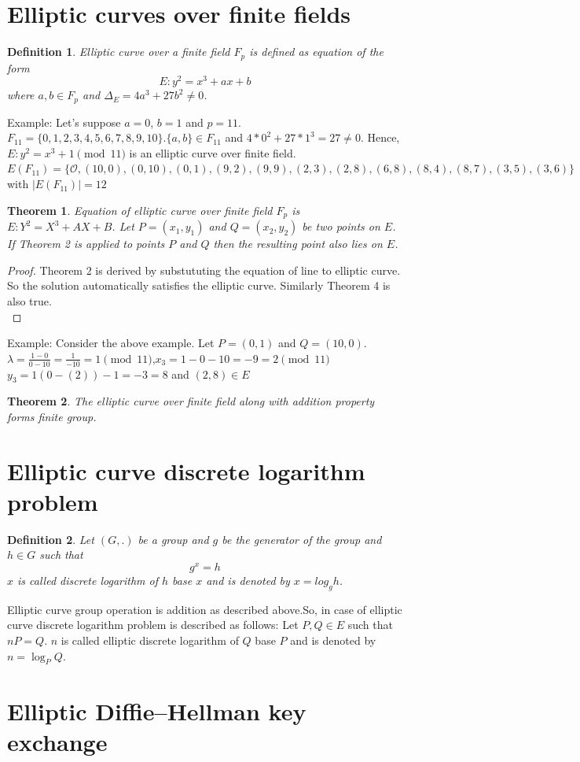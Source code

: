 \documentclass[12pt,a4paper]{report}
\newtheorem{theorem}{Theorem}
\newtheorem{definition}{Definition}
\begin{document}
\section{Elliptic curves over ﬁnite ﬁelds}
\begin{definition}
Elliptic curve over a finite field $F_p$ is defined as equation of the form $$E:y^2 = x^3+ax+b$$ where $a,b\in F_p$ and $\Delta_E = 4a^3+27b^2\neq 0$. 
\end{definition}
Example:
Let's suppose $a=0$, $b=1$ and $p=11$. \\
$F_{11}=\{0,1,2,3,4,5,6,7,8,9,10\}$.$\{a,b\}\in F_{11}$ and $4*0^2+27*1^3=27\neq 0$. Hence, $E:y^2 = x^3+1 \pmod {11} $ is an elliptic curve over finite field. \\
$E(F_{11}) = \{\mathscr{O},(10,0),(0,10),(0,1),(9,2),(9,9),(2,3),(2,8),(6,8),(8,4),(8,7),(3,5),(3,6)\}$
with $|E(F_{11})|=12$
\begin{theorem}
Equation of elliptic curve over finite field $F_p$ is $E : Y^2=X^3+
AX+B$. Let $P=(x_1,y_1)$ and $Q=(x_2,y_2)$ be two points on $E$. If Theorem 2 is applied to points $P$ and $Q$ then the resulting point also lies on $E$.
\end{theorem}
\begin{proof}
Theorem 2 is derived by substututing the equation of line to elliptic curve. So the solution automatically satisfies the elliptic curve. Similarly Theorem 4 is also true.\\
\end{proof}
Example: Consider the above example. Let $P=(0,1)$ and $Q=(10,0)$. 
$\lambda = \frac{1-0}{0-10} = \frac{1}{-	10} = 1 \pmod{11}$,$x_3=1-0-10=-9=2 \pmod{11}$\\ $y_3=1(0-(2))-1=-3=8$ and $(2,8) \in E$ \begin{theorem}
The elliptic curve over finite field along with addition property forms finite group.
\end{theorem}

\cleardoublepage
\section{Elliptic curve discrete logarithm problem}

\begin{definition}
Let $(G,.)$ be a group and $g$ be the generator of the group and $h\in G$ such that $$g^x=h$$
$x$ is called discrete logarithm of $h$ base $x$ and is denoted by $x=log_g h$.
\end{definition}
Elliptic curve group operation is addition as described above.So, in case of elliptic curve discrete logarithm problem is described as follows:
Let $P,Q \in E$ such that $nP=Q$. $n$ is called elliptic discrete logarithm of $Q$ base $P$ and is denoted by $n =\log_P Q$.

\cleardoublepage
\section{Elliptic Diﬃe–Hellman key exchange}



\end{document}

